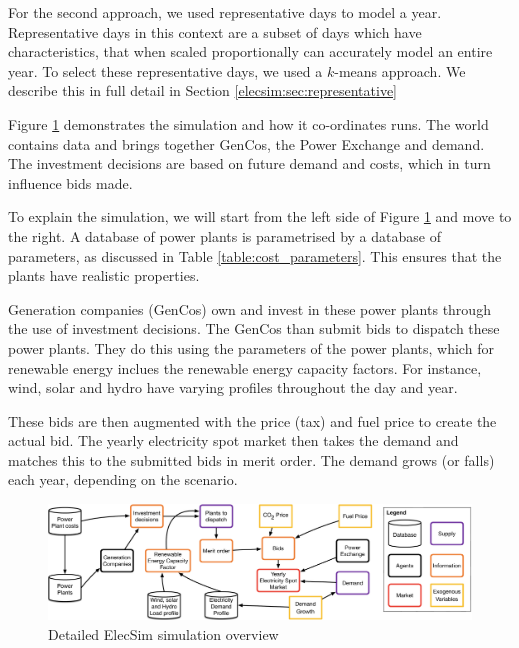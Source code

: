For the second approach, we used representative days to model a year. Representative days in this context are a subset of days which have characteristics, that when scaled proportionally can accurately model an entire year. To select these representative days, we used a $k$-means approach. We describe this in full detail in Section \ref{elecsim:sec:representative}





Figure \ref{fig:lowlevelsystem} demonstrates the simulation and how it co-ordinates runs. The world contains data and brings together GenCos, the Power Exchange and demand. The investment decisions are based on future demand and costs, which in turn influence bids made.

To explain the simulation, we will start from the left side of Figure \ref{fig:lowlevelsystem} and move to the right. A database of power plants is parametrised by a database of parameters, as discussed in Table \ref{table:cost_parameters}. This ensures that the plants have realistic properties. 

Generation companies (GenCos) own and invest in these power plants through the use of investment decisions. The GenCos than submit bids to dispatch these power plants. They do this using the parameters of the power plants, which for renewable energy inclues the renewable energy capacity factors. For instance, wind, solar and hydro have varying profiles throughout the day and year. 

These bids are then augmented with the  price (tax) and fuel price to create the actual bid. The yearly electricity spot market then takes the demand and matches this to the submitted bids in merit order. The demand grows (or falls) each year, depending on the scenario. 

\begin{landscape}
	\begin{figure}
		\centering
		\includegraphics[width=\linewidth]{Chapter4/figures/low_level_system}
		\caption{Detailed ElecSim simulation overview}
		\label{fig:lowlevelsystem}
	\end{figure}
\end{landscape}


